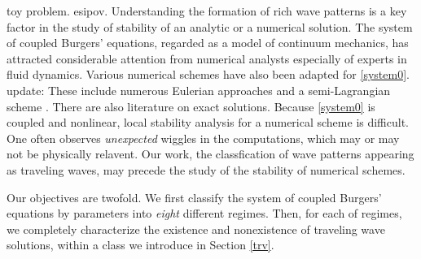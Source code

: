 \documentclass{amsart}
\def\blue{\color{blue}}
\theoremstyle{definition}
\numberwithin{equation}{section}
\begin{document}
{\blue 
toy problem. esipov.
Understanding the formation of rich wave patterns is a key factor in the study of stability of an analytic or a numerical solution. The system of coupled Burgers' equations, regarded as a model of continuum mechanics, has attracted considerable attention from numerical analysts especially of experts in fluid dynamics. Various numerical schemes have also been adapted for \eqref{system0}. {\blue update: These include numerous Eulerian approaches \cite{Bashan2020,Kutluay2013,Lai_2014,Li_2015,Liu2018,Mittal2011,Mittal2014,Rashid2014} and a semi-Lagrangian scheme \cite{bkk_2019}.} There are also literature \cite{Kaya2001, Khater2009, Piao2021,Soliman2006} on exact solutions. Because \eqref{system0} is coupled and nonlinear, local stability analysis for a numerical scheme is difficult. One often observes {\it unexpected} wiggles in the computations, which may or may not be physically relavent. Our work, the classfication of wave patterns appearing as traveling waves, may precede the study of the stability of numerical schemes. 
}

















Our objectives are twofold. We first classify the system of coupled Burgers' equations by parameters into {\it eight} different regimes. Then, for each of regimes, we completely characterize the existence and nonexistence of traveling wave solutions, within a class we introduce in Section \ref{trv}.
\end{document}
